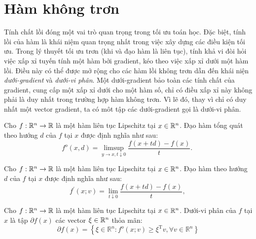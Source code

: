 \section{Hàm không trơn}
Tính chất lồi đóng một vai trò quan trọng trong tối ưu toán học. Đặc biệt, tính lồi của hàm là khái niệm quan trọng nhất trong việc xây dựng các điều kiện tối ưu. Trong lý thuyết tối ưu trơn (khi và đạo hàm là liên tục), tính khả vi đòi hỏi việc xấp xỉ tuyến tính một hàm bởi gradient, kéo theo việc xấp xỉ dưới một hàm lồi. Điều này có thể được mở rộng cho các hàm lồi không trơn dẫn đến khái niện \textit{dưới-gradient} và \textit{dưới-vi phân}. Một dưới-gradient bảo toàn các tính chất của gradient, cung cấp một xấp xỉ dưới cho một hàm số, chỉ có điều xấp xỉ này không phải là duy nhất trong trường hợp hàm không trơn. Vì lẽ đó, thay vì chỉ có duy nhất một vector gradient, ta có môt tập các  dưới-gradient gọi là dưới-vi phân.

\begin{dn}  \label{daohamtongquat}
Cho $ f: \mathbb{R}^n \rightarrow \mathbb{R} $ là một hàm liên tục Lipschitz tại $x \in \mathbb{R}^n$. Đạo hàm tổng quát theo hướng $d$ của $f$ tại $x$ được định nghĩa như sau:
\begin{equation*}
    f^o(x, d) = \limsup _{y \rightarrow x, t \downarrow 0} \frac{f(x+t d)-f(x)}{t} \text {. }
\end{equation*}
\end{dn} 

\begin{dn}  \label{daohamtheohuong}
    Cho $ f: \mathbb{R}^n \rightarrow \mathbb{R} $ là một hàm liên tục Lipschitz tại $x \in \mathbb{R}^n$. Đạo hàm theo hướng $d$ của $f$ tại $x$ được định nghĩa như sau:
    \begin{equation*}
        f^{\prime}(x ; v)=\lim _{t \downarrow 0} \frac{f(x+t d)-f(x)}{t} \text {, }
    \end{equation*}
\end{dn}

\begin{dn} 
    Cho $ f: \mathbb{R}^n \rightarrow \mathbb{R} $ là một hàm liên tục Lipschitz tại $x \in \mathbb{R}^n$. Dưới-vi phân của $f$ tại $x$ là tập $\partial f(x)$ các vector $\xi \in \mathbb{R}^n$ thỏa mãn:
    \begin{equation*}
        \partial f(x)=\left\{\xi \in \mathbb{R}^n: f^o(x ; v) \geq \xi^{\mathrm{T}} v\right., \forall v \in \left.\mathbb{R}^n\right\}
    \end{equation*}
\end{dn}


